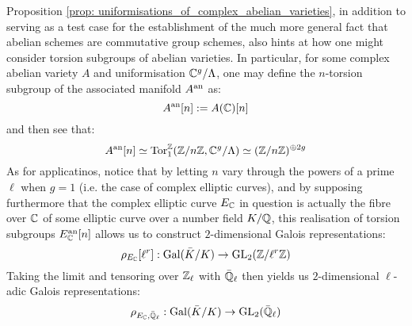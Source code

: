             \begin{remark}
                Proposition \ref{prop: uniformisations_of_complex_abelian_varieties}, in addition to serving as a test case for the establishment of the much more general fact that abelian schemes are commutative group schemes, also hints at how one might consider torsion subgroups of abelian varieties. In particular, for some complex abelian variety $A$ and uniformisation $\mathbb{C}^g/\Lambda$, one may define the $n$-torsion subgroup of the associated manifold $A^{\mathrm{an}}$ as:
                    $$A^{\mathrm{an}}[n] := A(\mathbb{C})[n]$$
                and then see that:
                    $$A^{\mathrm{an}}[n] \simeq \mathrm{Tor}_1^{\mathbb{Z}}(\mathbb{Z}/n\mathbb{Z}, \mathbb{C}^g/\Lambda) \simeq (\mathbb{Z}/n\mathbb{Z})^{\oplus 2g}$$
                As for applicatinos, notice that by letting $n$ vary through the powers of a prime $\ell$ when $g = 1$ (i.e. the case of complex elliptic curves), and by supposing furthermore that the complex elliptic curve $E_{\mathbb{C}}$ in question is actually the fibre over $\mathbb{C}$ of some elliptic curve over a number field $K/\mathbb{Q}$, this realisation of torsion subgroups $E_{\mathbb{C}}^{\mathrm{an}}[n]$ allows us to construct $2$-dimensional Galois representations:
                    $$\rho_{E_{\mathbb{C}}}[\ell^r]: \mathrm{Gal}(\bar{K}/K) \to \operatorname{GL}_2(\mathbb{Z}/\ell^r\mathbb{Z})$$
                Taking the limit and tensoring over $\mathbb{Z}_{\ell}$ with $\bar{\mathbb{Q}}_{\ell}$ then yields us $2$-dimensional $\ell$-adic Galois representations:
                    $$\rho_{E_{\mathbb{C}}, \bar{\mathbb{Q}}_{\ell}}: \mathrm{Gal}(\bar{K}/K) \to \operatorname{GL}_2(\bar{\mathbb{Q}}_{\ell})$$
            \end{remark}
            

